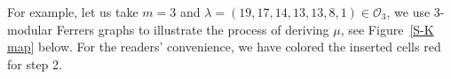 \documentclass[11pt,reqno]{amsart}
\numberwithin{equation}{section}
\theoremstyle{plain}
\theoremstyle{definition}
\newcommand{\OO}{\mathcal{O}}
\begin{document}
For example, let us take $m=3$ and $\lambda=(19,17,14,13,13,8,1)\in\OO_3$, we use $3$-modular Ferrers graphs \cite{Andr1976} to illustrate the process of deriving $\mu$, see Figure~\ref{S-K map} below. For the readers' convenience, we have colored the inserted cells red for step 2.

\begin{figure}[htp]
\begin{ferrers}


\putright
{}
\putright
{}



\end{ferrers}
\end{figure}
\end{document}
